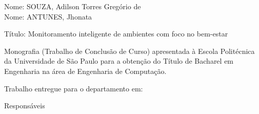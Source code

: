 \documentclass[]{politex}
\begin{document}
\capa
\falsafolhaderosto
\folhaderosto


\begin{folhadeaprovacao}
\noindent
Nome: SOUZA, Adilson Torres Gregório de\\
Nome: ANTUNES, Jhonata

\noindent
Título: Monitoramento inteligente de ambientes com foco no bem-estar

\vspace{1cm}
\hspace{.2\textwidth} %
\begin{minipage}{.75\textwidth}
  \begin{espacoumemeio}
    \begin{sloppypar}
        Monografia (Trabalho de Conclusão de Curso) apresentada à Escola Politécnica da Universidade de São Paulo para a obtenção do Título de Bacharel em Engenharia na área de Engenharia de Computação. \\[0.3cm]
    \end{sloppypar}
  \end{espacoumemeio}
\end{minipage} 
    
\noindent
Trabalho entregue para o departamento em: \\

\begin{center}
Responsáveis
\end{center}




\end{folhadeaprovacao}


\end{document}
